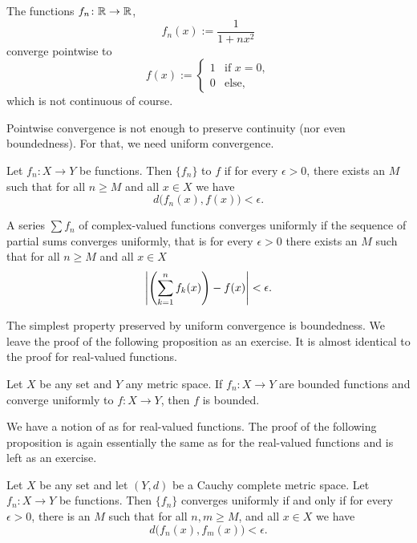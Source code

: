 \begin{example}
The functions $f_n \colon {\mathbb{R}} \to {\mathbb{R}}$,
\begin{equation*}
f_n(x) := \frac{1}{1+nx^2}
\end{equation*}
converge pointwise to
\begin{equation*}
f(x) := 
\begin{cases}
1 & \text{if } x=0, \\
0 & \text{else,}
\end{cases}
\end{equation*}
which is not continuous of course.
\end{example}

Pointwise convergence is not enough to preserve continuity (nor even
boundedness).  For that, we need uniform convergence.

Let $f_n \colon X \to Y$ be functions.  Then
$\{f_n\}$ \emph{}
to $f$ if
for every $\epsilon > 0$, there exists an $M$ such that
for all $n \geq M$ and all $x \in X$ we have
\begin{equation*}
d\bigl(f_n(x),f(x)\bigr) < \epsilon .
\end{equation*}

A series $\sum f_n$ of complex-valued functions converges uniformly if the sequence of
partial sums converges uniformly, that is for every $\epsilon > 0$
there exists an $M$ such that
for all $n \geq M$ and all $x \in X$
\begin{equation*}
\left\lvert {\left(\sum_{k=1}^n f_k(x)\right)-f(x)} \right\rvert < \epsilon .
\end{equation*}

The simplest property preserved by uniform convergence is
boundedness.  We leave the proof of the following proposition as an
exercise.  It is almost identical to the proof for real-valued functions.

\begin{prop} \label{prop:uniformconvbounded}
Let $X$ be any set and $Y$ any metric space.
If $f_n \colon X \to Y$ are bounded functions and converge uniformly to $f
\colon X \to Y$, then $f$ is bounded.
\end{prop}

We have a notion of \emph{} as for
real-valued functions.  The proof of the following proposition is
again essentially the same as for the real-valued functions and 
is left as an exercise.

\begin{prop} \label{prop:unifcauchymetric}
Let $X$ be any set and let $(Y,d)$ be a Cauchy complete metric space.
Let $f_n \colon X \to Y$ be functions.  Then $\{ f_n \}$ converges
uniformly if and only if for every $\epsilon > 0$, there is an $M$ such that
for all $n, m \geq M$, and all $x \in X$ we have
\begin{equation*}
d\bigl(f_n(x),f_m(x)\bigr) < \epsilon .
\end{equation*}
\end{prop}

